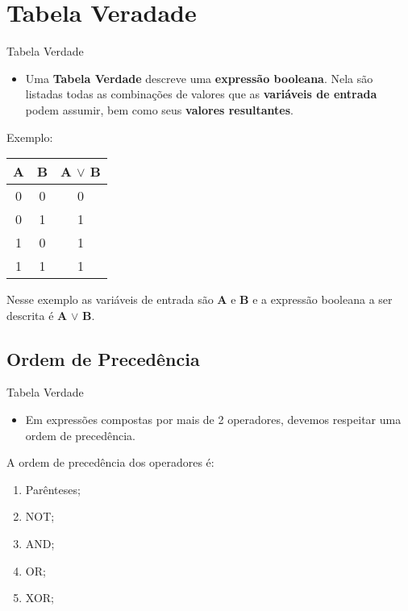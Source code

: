 \section{Tabela Veradade}



\begin{frame}{Tabela Verdade}
	\begin{itemize}
		\item Uma \textbf{Tabela Verdade} descreve uma \textbf{expressão booleana}. Nela são listadas todas as combinações de valores que as \textbf{variáveis de entrada} podem assumir, bem como seus \textbf{valores resultantes}.
	\end{itemize}

Exemplo:
		
		\begin{center}
		\begin{tabular}{|c|c|c|} \hline 
			\textbf{A} & \textbf{B} & \textbf{A $\vee$ B} \\ \hline 
			0 & 0 & 0 \\ \hline 
			0 & 1 & 1 \\ \hline 
			1 & 0 & 1 \\ \hline 
			1 & 1 & 1 \\ \hline 
		\end{tabular} 
		\end{center}

		Nesse exemplo as variáveis de entrada são \textbf{A} e \textbf{B} e a expressão booleana a ser descrita é \textbf{A} $\vee$ \textbf{B}.


\end{frame}

\subsection{Ordem de Precedência}


\begin{frame}{Tabela Verdade}

	\begin{itemize}
		\item Em expressões compostas por mais de 2 operadores, devemos respeitar uma ordem de precedência.
	\end{itemize}
	\vspace{1cm}
A ordem de precedência dos operadores é: 

\begin{enumerate}
	\item Parênteses;
	\item NOT;
	\item AND;
	\item OR;
	\item XOR;
\end{enumerate}

\end{frame}

